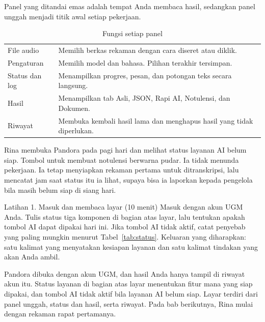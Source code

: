 Panel yang ditandai emas adalah tempat Anda membaca hasil, sedangkan panel unggah menjadi titik awal setiap pekerjaan.

\begin{table}[H]
\caption{Fungsi setiap panel}
\label{tab:panel}
{\small
\begin{tabularx}{\linewidth}{@{}P{4.2cm}Y@{}}
\toprule
{} &  \\
\midrule
File audio & Memilih berkas rekaman dengan cara diseret atau diklik. \\
Pengaturan & Memilih model dan bahasa. Pilihan terakhir tersimpan. \\
Status dan log & Menampilkan progres, pesan, dan potongan teks secara langsung. \\
Hasil & Menampilkan tab Asli, JSON, Rapi AI, Notulensi, dan Dokumen. \\
Riwayat & Membuka kembali hasil lama dan menghapus hasil yang tidak diperlukan. \\
\bottomrule
\end{tabularx}
}
\end{table}

\begin{ilustrasi}
Rina membuka Pandora pada pagi hari dan melihat status layanan AI belum siap. Tombol untuk membuat notulensi berwarna pudar. Ia tidak menunda pekerjaan. Ia tetap menyiapkan rekaman pertama untuk ditranskripsi, lalu mencatat jam saat status itu ia lihat, supaya bisa ia laporkan kepada pengelola bila masih belum siap di siang hari.
\end{ilustrasi}

\begin{kegiatan}{Latihan 1. Masuk dan membaca layar (10 menit)}
Masuk dengan akun UGM Anda. Tulis status tiga komponen di bagian atas layar, lalu tentukan apakah tombol AI dapat dipakai hari ini. Jika tombol AI tidak aktif, catat penyebab yang paling mungkin menurut Tabel~\ref{tab:status}. Keluaran yang diharapkan: satu kalimat yang menyatakan kesiapan layanan dan satu kalimat tindakan yang akan Anda ambil.
\end{kegiatan}

\begin{rangkuman}
Pandora dibuka dengan akun UGM, dan hasil Anda hanya tampil di riwayat akun itu. Status layanan di bagian atas layar menentukan fitur mana yang siap dipakai, dan tombol AI tidak aktif bila layanan AI belum siap. Layar terdiri dari panel unggah, status dan hasil, serta riwayat. Pada bab berikutnya, Rina mulai dengan rekaman rapat pertamanya.
\end{rangkuman}
